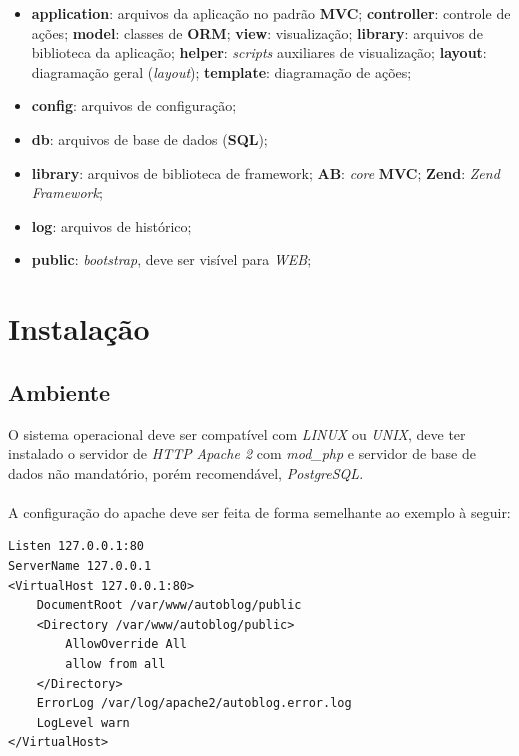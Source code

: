 \documentclass[a4paper,12pt]{article}
\begin{document}
\begin{itemize}
\item \textbf{application}: arquivos da aplicação no padrão \textbf{MVC};
\subitem \textbf{controller}: controle de ações;
\subitem \textbf{model}: classes de \textbf{ORM};
\subitem \textbf{view}: visualização;
\subitem \textbf{library}: arquivos de biblioteca da aplicação;
\subsubitem \textbf{helper}: \emph{scripts} auxiliares de visualização;
\subsubitem \textbf{layout}: diagramação geral (\emph{layout});
\subsubitem \textbf{template}: diagramação de ações;
\item \textbf{config}: arquivos de configuração;
\item \textbf{db}: arquivos de base de dados (\textbf{SQL});
\item \textbf{library}: arquivos de biblioteca de framework;
\subitem \textbf{AB}: \emph{core} \textbf{MVC};
\subitem \textbf{Zend}: \emph{Zend Framework};
\item \textbf{log}: arquivos de histórico;
\item \textbf{public}: \emph{bootstrap}, deve ser visível para \emph{WEB};
\end{itemize}


\section{Instalação}

\subsection{Ambiente}
O sistema operacional deve ser compatível com \emph{LINUX} ou \emph{UNIX}, deve ter instalado o servidor de \emph{HTTP} \emph{Apache 2} com \emph{mod\_php} e servidor de base de dados não mandatório, porém recomendável, \emph{PostgreSQL}.

\paragraph{}
A configuração do apache deve ser feita de forma semelhante ao exemplo à seguir:

\begin{verbatim}
Listen 127.0.0.1:80
ServerName 127.0.0.1
<VirtualHost 127.0.0.1:80>
    DocumentRoot /var/www/autoblog/public
    <Directory /var/www/autoblog/public>
        AllowOverride All
        allow from all
    </Directory>
    ErrorLog /var/log/apache2/autoblog.error.log
    LogLevel warn
</VirtualHost>
\end{verbatim}
\end{document}

